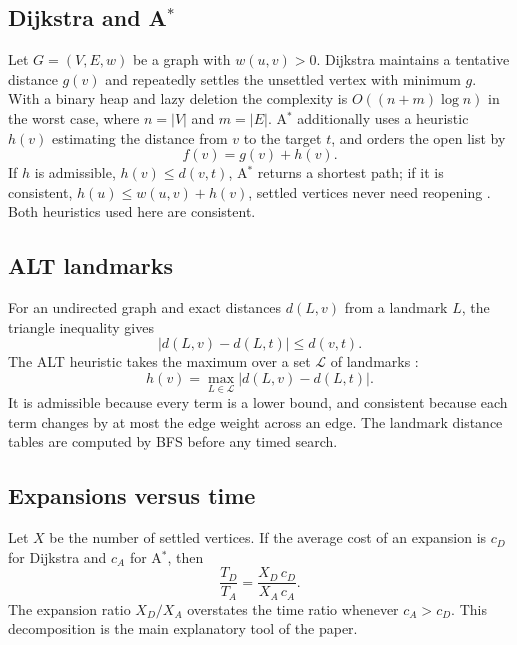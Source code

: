 \documentclass[conference,10pt]{IEEEtran}
\newcommand{\Astar}{A$^\ast$}
\begin{document}
\subsection{Dijkstra and \Astar{}}
Let $G=(V,E,w)$ be a graph with $w(u,v)>0$.  Dijkstra maintains a tentative
distance $g(v)$ and repeatedly settles the unsettled vertex with minimum $g$.
With a binary heap and lazy deletion the complexity is
$O((n+m)\log n)$ in the worst case, where $n=|V|$ and $m=|E|$.
\Astar{} additionally uses a heuristic $h(v)$ estimating the distance from $v$
to the target $t$, and orders the open list by
\begin{equation}
  f(v)=g(v)+h(v).
\end{equation}
If $h$ is admissible, $h(v)\le d(v,t)$, \Astar{} returns a shortest path; if it
is consistent, $h(u)\le w(u,v)+h(v)$, settled vertices never need reopening
\cite{hart1968,russell2020}.  Both heuristics used here are consistent.

\subsection{ALT landmarks}
For an undirected graph and exact distances $d(L,v)$ from a landmark $L$,
the triangle inequality gives
\begin{equation}
  |d(L,v)-d(L,t)| \le d(v,t).
\end{equation}
The ALT heuristic takes the maximum over a set $\mathcal{L}$ of landmarks
\cite{goldberg2005}:
\begin{equation}
  h(v)=\max_{L\in\mathcal{L}} |d(L,v)-d(L,t)|.
  \label{eq:alt}
\end{equation}
It is admissible because every term is a lower bound, and consistent because
each term changes by at most the edge weight across an edge.  The landmark
distance tables are computed by BFS before any timed search.

\subsection{Expansions versus time}
Let $X$ be the number of settled vertices.  If the average cost of an expansion
is $c_D$ for Dijkstra and $c_A$ for \Astar{}, then
\begin{equation}
  \frac{T_D}{T_A}=\frac{X_D\,c_D}{X_A\,c_A}.
\end{equation}
The expansion ratio $X_D/X_A$ overstates the time ratio whenever $c_A>c_D$.
This decomposition is the main explanatory tool of the paper.
\end{document}
